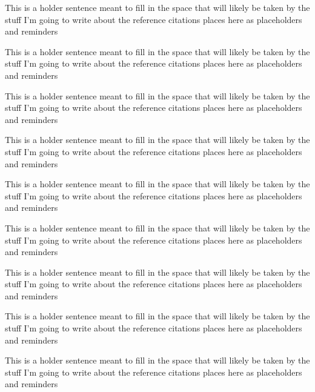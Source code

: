 \cite{lorenz2011a-code}

This is a holder sentence meant to fill in the space that will likely be taken by the stuff I'm going to write about the reference citations places here as placeholders and reminders

\cite{taha2008domain-specific}

This is a holder sentence meant to fill in the space that will likely be taken by the stuff I'm going to write about the reference citations places here as placeholders and reminders

\cite{deursen2000domain-specific}

This is a holder sentence meant to fill in the space that will likely be taken by the stuff I'm going to write about the reference citations places here as placeholders and reminders

\cite{dmitriev2004a-language}

This is a holder sentence meant to fill in the space that will likely be taken by the stuff I'm going to write about the reference citations places here as placeholders and reminders

\cite{hudak1998modular}

This is a holder sentence meant to fill in the space that will likely be taken by the stuff I'm going to write about the reference citations places here as placeholders and reminders

\cite{spinellis2001notable}

This is a holder sentence meant to fill in the space that will likely be taken by the stuff I'm going to write about the reference citations places here as placeholders and reminders

\cite{mitchell1993on-abstraction}

This is a holder sentence meant to fill in the space that will likely be taken by the stuff I'm going to write about the reference citations places here as placeholders and reminders

\cite{odersky2008programming}

This is a holder sentence meant to fill in the space that will likely be taken by the stuff I'm going to write about the reference citations places here as placeholders and reminders

\cite{simpkins2008towards}

This is a holder sentence meant to fill in the space that will likely be taken by the stuff I'm going to write about the reference citations places here as placeholders and reminders


